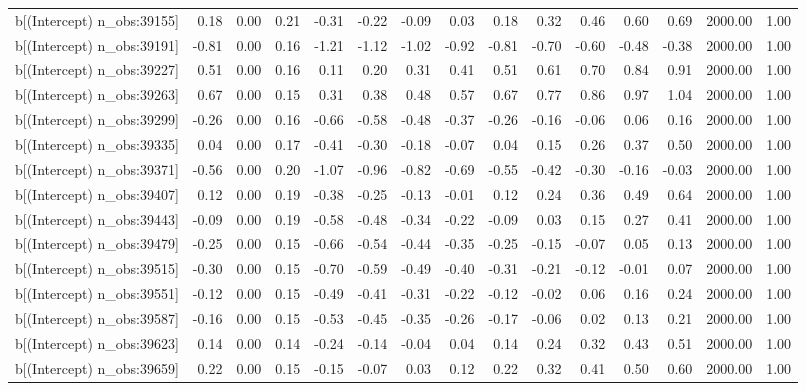 \begin{table}[ht]
\begin{tabular}{rrrrrrrrrrrrrrr}
  b[(Intercept) n\_obs:39155] & 0.18 & 0.00 & 0.21 & -0.31 & -0.22 & -0.09 & 0.03 & 0.18 & 0.32 & 0.46 & 0.60 & 0.69 & 2000.00 & 1.00 \\ 
  b[(Intercept) n\_obs:39191] & -0.81 & 0.00 & 0.16 & -1.21 & -1.12 & -1.02 & -0.92 & -0.81 & -0.70 & -0.60 & -0.48 & -0.38 & 2000.00 & 1.00 \\ 
  b[(Intercept) n\_obs:39227] & 0.51 & 0.00 & 0.16 & 0.11 & 0.20 & 0.31 & 0.41 & 0.51 & 0.61 & 0.70 & 0.84 & 0.91 & 2000.00 & 1.00 \\ 
  b[(Intercept) n\_obs:39263] & 0.67 & 0.00 & 0.15 & 0.31 & 0.38 & 0.48 & 0.57 & 0.67 & 0.77 & 0.86 & 0.97 & 1.04 & 2000.00 & 1.00 \\ 
  b[(Intercept) n\_obs:39299] & -0.26 & 0.00 & 0.16 & -0.66 & -0.58 & -0.48 & -0.37 & -0.26 & -0.16 & -0.06 & 0.06 & 0.16 & 2000.00 & 1.00 \\ 
  b[(Intercept) n\_obs:39335] & 0.04 & 0.00 & 0.17 & -0.41 & -0.30 & -0.18 & -0.07 & 0.04 & 0.15 & 0.26 & 0.37 & 0.50 & 2000.00 & 1.00 \\ 
  b[(Intercept) n\_obs:39371] & -0.56 & 0.00 & 0.20 & -1.07 & -0.96 & -0.82 & -0.69 & -0.55 & -0.42 & -0.30 & -0.16 & -0.03 & 2000.00 & 1.00 \\ 
  b[(Intercept) n\_obs:39407] & 0.12 & 0.00 & 0.19 & -0.38 & -0.25 & -0.13 & -0.01 & 0.12 & 0.24 & 0.36 & 0.49 & 0.64 & 2000.00 & 1.00 \\ 
  b[(Intercept) n\_obs:39443] & -0.09 & 0.00 & 0.19 & -0.58 & -0.48 & -0.34 & -0.22 & -0.09 & 0.03 & 0.15 & 0.27 & 0.41 & 2000.00 & 1.00 \\ 
  b[(Intercept) n\_obs:39479] & -0.25 & 0.00 & 0.15 & -0.66 & -0.54 & -0.44 & -0.35 & -0.25 & -0.15 & -0.07 & 0.05 & 0.13 & 2000.00 & 1.00 \\ 
  b[(Intercept) n\_obs:39515] & -0.30 & 0.00 & 0.15 & -0.70 & -0.59 & -0.49 & -0.40 & -0.31 & -0.21 & -0.12 & -0.01 & 0.07 & 2000.00 & 1.00 \\ 
  b[(Intercept) n\_obs:39551] & -0.12 & 0.00 & 0.15 & -0.49 & -0.41 & -0.31 & -0.22 & -0.12 & -0.02 & 0.06 & 0.16 & 0.24 & 2000.00 & 1.00 \\ 
  b[(Intercept) n\_obs:39587] & -0.16 & 0.00 & 0.15 & -0.53 & -0.45 & -0.35 & -0.26 & -0.17 & -0.06 & 0.02 & 0.13 & 0.21 & 2000.00 & 1.00 \\ 
  b[(Intercept) n\_obs:39623] & 0.14 & 0.00 & 0.14 & -0.24 & -0.14 & -0.04 & 0.04 & 0.14 & 0.24 & 0.32 & 0.43 & 0.51 & 2000.00 & 1.00 \\ 
  b[(Intercept) n\_obs:39659] & 0.22 & 0.00 & 0.15 & -0.15 & -0.07 & 0.03 & 0.12 & 0.22 & 0.32 & 0.41 & 0.50 & 0.60 & 2000.00 & 1.00 \\ 

\end{tabular}
\end{table}
